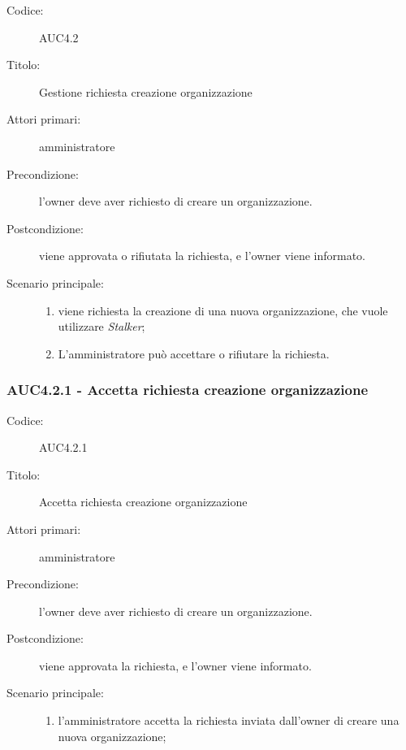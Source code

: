 \documentclass[casi-duso]{subfiles}
\begin{document}
\begin{description}
  \item[Codice:] AUC4.2
  \item[Titolo:] Gestione richiesta creazione organizzazione
  \item[Attori primari:] amministratore
  \item[Precondizione:] l'owner deve aver richiesto di creare un organizzazione.
  \item[Postcondizione:] viene approvata o rifiutata la richiesta, e l'owner viene informato.
  \item[Scenario principale:]
  \begin{enumerate}
    \item viene richiesta la creazione di una nuova organizzazione, che vuole utilizzare \emph{Stalker};
    \item L'amministratore può accettare o rifiutare la richiesta.
  \end{enumerate}
\end{description}

\subsubsection{AUC4.2.1 - Accetta richiesta creazione organizzazione}%
\label{subsub:AUC4.2.1}
\begin{description}
  \item[Codice:] AUC4.2.1
  \item[Titolo:] Accetta richiesta creazione organizzazione
  \item[Attori primari:] amministratore
  \item[Precondizione:] l'owner deve aver richiesto di creare un organizzazione.
  \item[Postcondizione:] viene approvata la richiesta, e l'owner viene informato.
  \item[Scenario principale:]
  \begin{enumerate}
    \item  l'amministratore accetta la richiesta inviata dall'owner di creare una nuova organizzazione;
  \end{enumerate}
\end{description}
\end{document}
